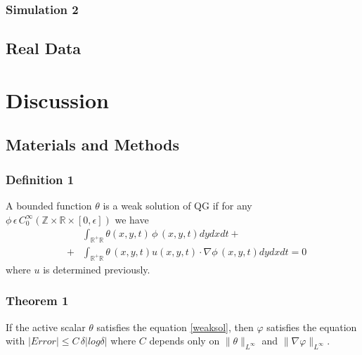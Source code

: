 \documentclass[a4paper, oneside, 11pt, green]{ssjtwo}
\begin{document}
\begin{article}
\subsubsection{Simulation 2}

\lipsum[1]

\subsection*{Real Data}

\lipsum[1]

\section*{Discussion}

\lipsum[1]

\lipsum[1]

\lipsum[1]

\subsection*{Materials and Methods}

\lipsum[1]

\subsubsection*{Definition 1}A bounded function $\theta$ is a weak solution of QG if for any
$\phi\,\epsilon\, C_0^{\infty}
(\mathbb{Z}\times\mathbb{R}
\times[0,\epsilon ])$ we have
\begin{eqnarray}
&&  \int_{\mathbb{R}^+\mathbb{R}}
 \theta(x,y,t)\, \phi
\,(x,y,t) dy dx dt+\nonumber\\
  & +&\int_{\mathbb{R}^+\mathbb{R}}
 \theta\,(x,y,t) u(x,y,t)\cdot\nabla\phi\,(x,y,t)
dydxdt = 0 \label{weaksol} \end{eqnarray}
where $u$ is determined previously.

\lipsum[1]

\subsubsection*{Theorem 1}
If the active scalar $\theta$ satisfies
the equation \eqref{weaksol}, then $\varphi$ satisfies the equation
with $|Error|\leq C\, \delta | log\delta| $ where $C$ depends only
on $\|\theta\|_{L^{\infty}}$ and $\|
\nabla\varphi\|_{L^{\infty}}$.

\lipsum[1]
\begin{acknowledgments}
\lipsum[1]
\end{acknowledgments}
\end{article}
\end{document}
